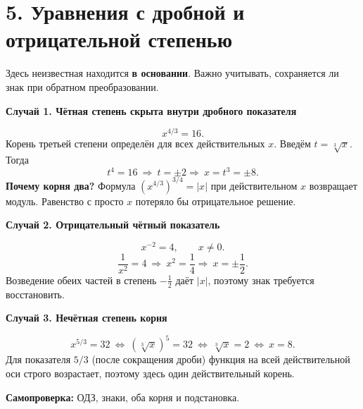 \documentclass[a4paper,12pt]{article}
\newcommand{\key}[1]{\textcolor{darkaccent}{\textbf{#1}}}
\newcommand{\sub}[1]{\medskip\noindent\textcolor{darkaccent}{\large\bfseries #1}\par\vspace{2pt}}
\begin{document}
\section*{5. Уравнения с дробной и отрицательной степенью}
Здесь неизвестная находится \key{в основании}. Важно учитывать, сохраняется ли знак при обратном преобразовании.

\sub{Случай 1. Чётная степень скрыта внутри дробного показателя}
\[
 x^{4/3}=16.
\]
Корень третьей степени определён для всех действительных $x$. Введём $t=\sqrt[3]{x}$. Тогда
\[
 t^4=16\ \Longrightarrow\ t=\pm2
 \Longrightarrow\ \boxed{x=t^3=\pm8}.
\]
\key{Почему корня два?} Формула $(x^{4/3})^{3/4}=|x|$ при действительном $x$ возвращает модуль. Равенство с просто $x$ потеряло бы отрицательное решение.

\sub{Случай 2. Отрицательный чётный показатель}
\[
 x^{-2}=4,\qquad x\ne0.
\]
\[
 \frac1{x^2}=4\ \Longrightarrow\ x^2=\frac14
 \Longrightarrow\ \boxed{x=\pm\frac12}.
\]
Возведение обеих частей в степень $-\frac12$ даёт $|x|$, поэтому знак требуется восстановить.

\sub{Случай 3. Нечётная степень корня}
\[
 x^{5/3}=32\ \Longleftrightarrow\
 (\sqrt[3]{x})^5=32\ \Longleftrightarrow\
 \sqrt[3]{x}=2\ \Longleftrightarrow\ \boxed{x=8}.
\]
Для показателя $5/3$ (после сокращения дроби) функция на всей действительной оси строго возрастает, поэтому здесь один действительный корень.

\textcolor{darkaccent}{\textbf{Самопроверка:}} ОДЗ, знаки, оба корня и подстановка.
\end{document}
